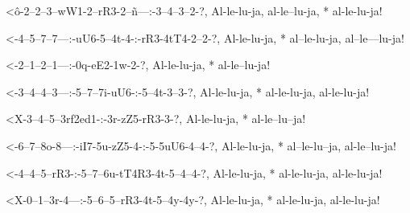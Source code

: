   {<ô-2--2--3--wW1-2--rR3-2--ñ---:-3--4--3--2-?,}
  {   Al-le-lu-ja, al-le--lu-ja, * al-le-lu-ja!}

  {<-4--5--7--7---:-uU6-5--4t-4-:-rR3-4tT4-2--2-?,}
  {  Al-le-lu-ja, * al--le-lu-ja, al--le---lu-ja!}

  {<-2--1--2--1---:-0q-eE2-1w-2-?,}
  {  Al-le-lu-ja, * al-le--lu-ja!}

  {<-3--4--4--3---:-5--7--7i-uU6-:-5--4t-3--3-?,}
  {  Al-le-lu-ja, * al-le-lu-ja,   al-le-lu-ja!}

  {<X-3--4--5--3rf2ed1-:-3r-zZ5-rR3-3-?,}
  {   Al-le-lu-ja,     * al-le--lu--ja!}

  {<-6--7--8o-8---:-iI7-5u-zZ5-4-:-5-5uU6-4--4-?,}
  {  Al-le-lu-ja, * al--le-lu--ja, al-le--lu-ja!}

  {<-4--4--5--rR3-:-5--7--6u-tT4R3-4t-5--4--4-?,}
  {  Al-le-lu-ja, * al-le-lu-ja,   al-le-lu-ja!}

  {<X-0--1--3r-4---:-5--6--5--rR3-4t-5--4y-4y-?,}
  {   Al-le-lu-ja, * al-le-lu-ja, al-le-lu-ja!}



